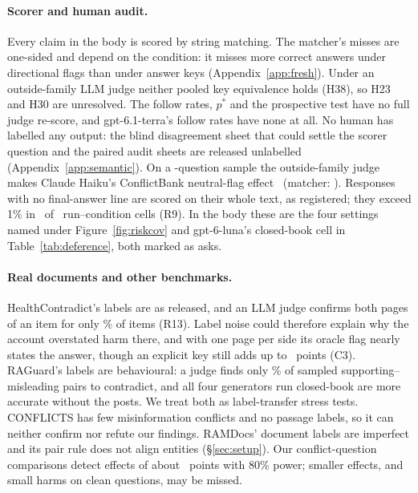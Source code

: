 \paragraph{Scorer and human audit.} Every claim in the body is scored by string matching. The matcher's misses are one-sided and
depend on the condition: it misses more correct answers under directional flags than under answer keys
(Appendix~\ref{app:fresh}). Under an outside-family LLM judge neither pooled key equivalence holds (H38), so H23 and
H30 are unresolved. The follow rates, $p^*$ and the prospective test have no full judge re-score, and
gpt-6.1-terra's follow rates have none at all. No human has labelled any output: the blind disagreement sheet that
could settle the scorer question and the paired audit sheets are released unlabelled (Appendix~\ref{app:semantic}).
On a \semNq-question sample the outside-family judge makes Claude Haiku's ConflictBank neutral-flag effect
\semNeuCBsHaikuJ\ (matcher: \semNeuCBsHaikuM). Responses with no final-answer line are scored on their whole text, as registered;
they exceed 1\% in \missCellsAbove\ of \missCells\ run--condition cells (R9). In the body these are the four settings
named under Figure~\ref{fig:riskcov} and gpt-6-luna's closed-book cell in Table~\ref{tab:deference}, both marked
as  asks.

\paragraph{Real documents and other benchmarks.} HealthContradict's labels are as released, and an LLM judge confirms
both pages of an item for only \stanceBoth\% of items (R13). Label noise could therefore explain why the account
overstated harm there, and with one page per side its oracle flag nearly states the answer, though an explicit key
still adds up to \cxHcKeyDirLuna\ points (C3). RAGuard's labels are
behavioural: a judge finds only \rgAudContradict\% of sampled supporting--misleading pairs to contradict, and all four
generators run closed-book are more accurate without the posts. We treat both as label-transfer stress tests.
CONFLICTS has few misinformation conflicts and no passage labels, so it can neither confirm nor refute our findings.
RAMDocs' document labels are imperfect and its pair rule does not align entities (\S\ref{sec:setup}). Our
conflict-question comparisons detect effects of about \mdeMed\ points with 80\% power; smaller effects, and small
harms on clean questions, may be missed.

